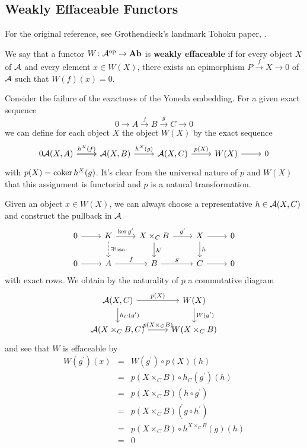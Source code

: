 \documentclass[reqno, 12pt]{amsart}
\begin{document}
\subsection{Weakly Effaceable Functors}
For the original reference, see Grothendieck's landmark Tohoku paper, \cite{Tohoku}.

\begin{definition}
  We say that a functor $W \colon \mathcal{A}^{\operatorname{op}} \to \operatorname{\bf Ab}$ is \textbf{weakly effaceable} if for every object $X$ of $\mathcal{A}$ and every element $x \in W(X)$, there exists an epimorphism $P \overset{f}\to X \to 0$ of $\mathcal{A}$ such that $W(f)(x) = 0$.
\end{definition}

Consider the failure of the exactness of the Yoneda embedding.
For a given exact sequence
$$0 \to A \overset{f}\to B \overset{g}\to C \to 0$$
we can define for each object $X$ the object $W(X)$ by the exact sequence
$$\begin{tikzcd}
  0 \arrow{r} \A(X,A) \arrow{r}{h^X(f)} & \A(X,B) \arrow{r}{h^X(g)} & \A(X,C) \arrow{r}{p(X)} & W(X) \arrow{r} & 0 
\end{tikzcd}$$
with $p(X) = \operatorname{coker} h^X(g)$.
It's clear from the universal nature of $p$ and $W(X)$ that this assignment is functorial and $p$ is a natural transformation.

Given an object $x \in W(X)$, we can always choose a representative $h \in \mathcal{A}(X,C)$ and construct the pullback in $\mathcal{A}$
$$\begin{tikzcd}
0 \arrow{r} &  K \arrow{r}{\op{ker} g^\prime}\arrow[dashed]{d}{\exists !\op{iso}} & X \times_C B \arrow{d}{h^\prime}\arrow{r}{g^\prime} & X \arrow{d}{h}\arrow{r} & 0\\
0 \arrow{r} & A \arrow{r}{f} & B \arrow{r}{g} & C \arrow{r} & 0
\end{tikzcd}$$
with exact rows.
We obtain by the naturality of $p$ a commutative diagram
$$\begin{tikzcd}
  \A(X,C) \arrow{r}{p(X)}\arrow{d}{h_C(g^\prime)} & W(X)\arrow{d}{W(g^\prime)}\\
  \A(X \times_C B, C) \arrow{r}{p(X \times_C B)} & W(X \times_C B)
\end{tikzcd}$$
and see that $W$ is effaceable by
\begin{eqnarray*}
  W(g^\prime)(x) &=& W(g^\prime) \circ p(X)(h)\\
  &=& p(X \times_C B) \circ h_C(g^\prime)(h)\\
  &=& p(X \times_C B)(h \circ g^\prime)\\
  &=& p(X \times_C B)(g \circ h^\prime)\\
  &=& p(X \times_C B)\circ h^{X \times_C B}(g)(h)\\
  &=& 0
\end{eqnarray*}
\end{document}
